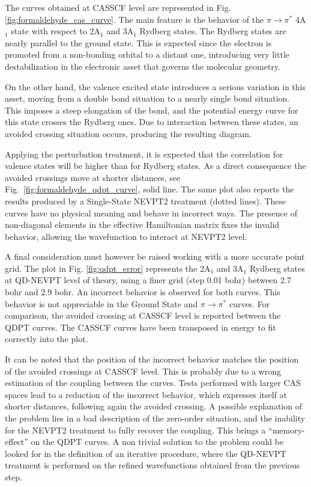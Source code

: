 The curves obtained at CASSCF level are represented in Fig.
\ref{fig:formaldehyde_cas_curve}. The main feature is the behavior of the
$\pi \rightarrow \pi^{*}$ 4A$_1$ state with respect to 2A$_1$ and 3A$_1$
Rydberg states. The Rydberg states are nearly parallel to the ground state.
This is expected since the electron is promoted from a non-bonding orbital
to a distant one, introducing very little destabilization in the electronic
asset that governs the molecular geometry.

On the other hand, the valence
excited state introduces a serious variation in this asset, moving from a
double bond situation to a nearly single bond situation. This imposes a
steep elongation of the bond, and the potential energy curve for this state
crosses the Rydberg ones. Due to interaction between these states, an
avoided crossing situation occurs, producing the resulting diagram.
\vspace{-3mm}

Applying the perturbation treatment, it is expected that the correlation for
valence states will be higher than for Rydberg states. 
As a direct consequence the avoided crossings move at shorter distances, see
Fig.~\ref{fig:formaldehyde_qdpt_curve}, solid line. The same plot also
reports the results produced by a Single-State NEVPT2 treatment (dotted
lines). These curves have no physical meaning and behave in incorrect ways.
The presence of non-diagonal elements in the effective Hamiltonian matrix
fixes the invalid behavior, allowing the wavefunction to interact at NEVPT2
level.
\vspace{-3mm}

\vspace{-3mm}
A final consideration must however be raised working with a more accurate
point grid. The plot in Fig. \ref{fig:qdpt_error} represents the 2A$_1$ and
3A$_1$ Rydberg states at QD-NEVPT level of theory, using a finer grid (step
0.01 bohr) between 2.7 bohr and 2.9 bohr. An incorrect behavior is observed
for both curves. This behavior is not appreciable in the Ground
State and $\pi \rightarrow \pi^{*}$ curves. For comparison, the avoided
crossing at CASSCF level is reported between the QDPT curves. The CASSCF
curves have been transposed in energy to fit correctly into the plot.

It can be noted that the position of the incorrect behavior matches the
position of the avoided crossings at CASSCF level. This is probably due to a
wrong estimation of the coupling between the curves. Tests performed with
larger CAS spaces lead to a reduction of the incorrect behavior, which
expresses itself at shorter distances, following again the avoided crossing.
A possible explanation of the problem lies in a bad description of the
zero-order situation, and the inability for the NEVPT2 treatment to fully
recover the coupling. This brings a ``memory-effect'' on the QDPT curves.  A
non trivial solution to the problem could be looked for in the definition of an
iterative procedure, where the QD-NEVPT treatment is performed on the
refined wavefunctions obtained from the previous step. 
\vspace{-3mm}

\vspace{-6mm}

